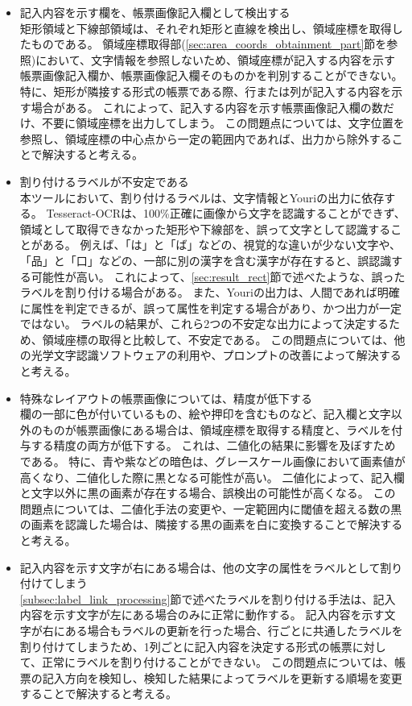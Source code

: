 \begin{itemize}
    \item 記入内容を示す欄を、帳票画像記入欄として検出する\\
        矩形領域と下線部領域は、それぞれ矩形と直線を検出し、領域座標を取得したものである。
        領域座標取得部(\ref{sec:area_coords_obtainment_part}節を参照)において、文字情報を参照しないため、領域座標が記入する内容を示す帳票画像記入欄か、帳票画像記入欄そのものかを判別することができない。
        特に、矩形が隣接する形式の帳票である際、行または列が記入する内容を示す場合がある。
        これによって、記入する内容を示す帳票画像記入欄の数だけ、不要に領域座標を出力してしまう。
        この問題点については、文字位置を参照し、領域座標の中心点から一定の範囲内であれば、出力から除外することで解決すると考える。
    \item 割り付けるラベルが不安定である\\
        本ツールにおいて、割り付けるラベルは、文字情報とYouriの出力に依存する。
        Tesseract-OCRは、100\%正確に画像から文字を認識することができず、領域として取得できなかった矩形や下線部を、誤って文字として認識することがある。
        例えば、「は」と「ば」などの、視覚的な違いが少ない文字や、「品」と「口」などの、一部に別の漢字を含む漢字が存在すると、誤認識する可能性が高い。
        これによって、\ref{sec:result_rect}節で述べたような、誤ったラベルを割り付ける場合がある。
        また、Youriの出力は、人間であれば明確に属性を判定できるが、誤って属性を判定する場合があり、かつ出力が一定ではない。
        ラベルの結果が、これら2つの不安定な出力によって決定するため、領域座標の取得と比較して、不安定である。 
        この問題点については、他の光学文字認識ソフトウェアの利用や、プロンプトの改善によって解決すると考える。
    \item 特殊なレイアウトの帳票画像については、精度が低下する\\
        欄の一部に色が付いているもの、絵や押印を含むものなど、記入欄と文字以外のものが帳票画像にある場合は、領域座標を取得する精度と、ラベルを付与する精度の両方が低下する。
        これは、二値化の結果に影響を及ぼすためである。
        特に、青や紫などの暗色は、グレースケール画像において画素値が高くなり、二値化した際に黒となる可能性が高い。
        二値化によって、記入欄と文字以外に黒の画素が存在する場合、誤検出の可能性が高くなる。
        この問題点については、二値化手法の変更や、一定範囲内に閾値を超える数の黒の画素を認識した場合は、隣接する黒の画素を白に変換することで解決すると考える。
    \item 記入内容を示す文字が右にある場合は、他の文字の属性をラベルとして割り付けてしまう\\
        \ref{subsec:label_link_processing}節で述べたラベルを割り付ける手法は、記入内容を示す文字が左にある場合のみに正常に動作する。
        記入内容を示す文字が右にある場合もラベルの更新を行った場合、行ごとに共通したラベルを割り付けてしまうため、1列ごとに記入内容を決定する形式の帳票に対して、正常にラベルを割り付けることができない。
        この問題点については、帳票の記入方向を検知し、検知した結果によってラベルを更新する順場を変更することで解決すると考える。
\end{itemize}